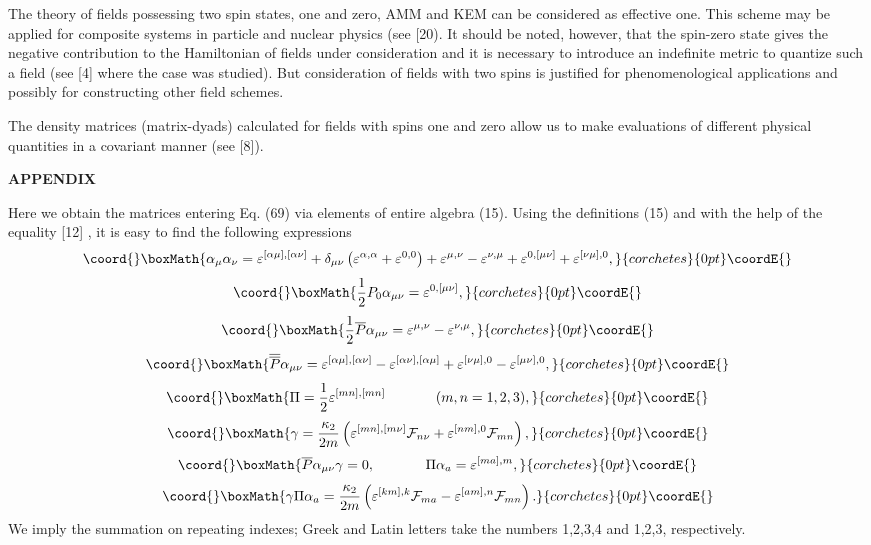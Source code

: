\documentclass[a4paper,12pt]{article}
\begin{document}
The theory of fields possessing two spin states, one and zero, AMM
and KEM can be considered as effective one. This scheme may be
applied for composite systems in particle and nuclear physics (see
[20). It should be noted, however, that the spin-zero state gives
the negative contribution to the Hamiltonian of fields under
consideration and it is necessary to introduce an indefinite
metric to quantize such a field (see [4] where the case \coordHE{}
was studied). But consideration of fields with two spins is
justified for phenomenological applications and possibly for
constructing other field schemes.

The density matrices (matrix-dyads) calculated for fields with
spins one and zero allow us to make evaluations of different
physical quantities in a covariant manner (see [8]).

\begin{center}
{\bf APPENDIX}
\end{center}

Here we obtain the matrices entering Eq. (69) via elements of
entire algebra (15). Using the definitions (15) and with the help
of the equality [12] \myHighlight{$\delta _{[\mu \nu ][\rho \sigma ]}=\delta
_{\mu \rho }\delta _{\nu \sigma }-\delta _{\mu \sigma }\delta
_{\nu \rho }$}\coordHE{}, it is easy to find the following expressions
\[\coord{}\boxMath{
\alpha_\mu\alpha_\nu=\varepsilon^{[\alpha\mu],[\alpha\nu]}+\delta_{\mu\nu}
\left(\varepsilon^{\alpha,\alpha}+\varepsilon^{0,0}\right)+
\varepsilon^{\mu,\nu}-\varepsilon^{\nu,\mu}
+\varepsilon^{0,[\mu\nu]}+\varepsilon^{[\nu\mu],0},
}{corchetes}{0pt}\coordE{}\]
\[\coord{}\boxMath{
\frac12P_0\alpha_{\mu\nu}=\varepsilon^{0,[\mu\nu]},
}{corchetes}{0pt}\coordE{}\]
\[\coord{}\boxMath{
\frac12\overline{P}\alpha_{\mu\nu}=
\varepsilon^{\mu,\nu}-\varepsilon^{\nu,\mu},
}{corchetes}{0pt}\coordE{}\]
\[\coord{}\boxMath{
\overline{\overline{P}}\alpha_{\mu\nu}=\varepsilon^{[\alpha\mu],[\alpha\nu]}
-\varepsilon^{[\alpha\nu],[\alpha\mu]}+\varepsilon^{[\nu\mu],0}-
\varepsilon^{[\mu\nu],0},
}{corchetes}{0pt}\coordE{}\]
\[\coord{}\boxMath{
\Pi=\frac12 \varepsilon^{[mn],[mn]}\hspace{0.5in}(m,n=1,2,3),
}{corchetes}{0pt}\coordE{}\]
\[\coord{}\boxMath{
\gamma=\frac{\kappa_2}{2m}\left(\varepsilon^{[mn],[m\nu]}\mathcal{F}_{n\nu}+
\varepsilon^{[nm],0}\mathcal{F}_{mn}\right),
}{corchetes}{0pt}\coordE{}\]
\[\coord{}\boxMath{
\overline{P}\alpha_{\mu\nu}\gamma=0,\hspace{0.5in}\Pi\alpha_a=
\varepsilon^{[ma],m},
}{corchetes}{0pt}\coordE{}\]
\[\coord{}\boxMath{
\gamma\Pi\alpha_a=\frac{\kappa_2}{2m}\left(\varepsilon^{[km],k}
\mathcal{F}_{ma}-\varepsilon^{[am],n}\mathcal{F}_{mn}\right).
}{corchetes}{0pt}\coordE{}\]
We imply the summation on repeating indexes; Greek and Latin
letters take the numbers 1,2,3,4 and 1,2,3, respectively.
\end{document}
